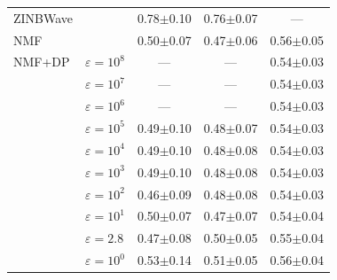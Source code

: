 \begin{tabular}{llccc}
\addlinespace[3pt]
ZINBWave &  & 0.78{\scriptsize$\pm$0.10} & 0.76{\scriptsize$\pm$0.07} & --- \\
\addlinespace[3pt]
NMF &  & 0.50{\scriptsize$\pm$0.07} & 0.47{\scriptsize$\pm$0.06} & 0.56{\scriptsize$\pm$0.05} \\
\addlinespace[3pt]
NMF+DP & $\varepsilon=10^{8}$ & --- & --- & 0.54{\scriptsize$\pm$0.03} \\
 & $\varepsilon=10^{7}$ & --- & --- & 0.54{\scriptsize$\pm$0.03} \\
 & $\varepsilon=10^{6}$ & --- & --- & 0.54{\scriptsize$\pm$0.03} \\
 & $\varepsilon=10^{5}$ & 0.49{\scriptsize$\pm$0.10} & 0.48{\scriptsize$\pm$0.07} & 0.54{\scriptsize$\pm$0.03} \\
 & $\varepsilon=10^{4}$ & 0.49{\scriptsize$\pm$0.10} & 0.48{\scriptsize$\pm$0.08} & 0.54{\scriptsize$\pm$0.03} \\
 & $\varepsilon=10^{3}$ & 0.49{\scriptsize$\pm$0.10} & 0.48{\scriptsize$\pm$0.08} & 0.54{\scriptsize$\pm$0.03} \\
 & $\varepsilon=10^{2}$ & 0.46{\scriptsize$\pm$0.09} & 0.48{\scriptsize$\pm$0.08} & 0.54{\scriptsize$\pm$0.03} \\
 & $\varepsilon=10^{1}$ & 0.50{\scriptsize$\pm$0.07} & 0.47{\scriptsize$\pm$0.07} & 0.54{\scriptsize$\pm$0.04} \\
 & $\varepsilon=2.8$ & 0.47{\scriptsize$\pm$0.08} & 0.50{\scriptsize$\pm$0.05} & 0.55{\scriptsize$\pm$0.04} \\
 & $\varepsilon=10^{0}$ & 0.53{\scriptsize$\pm$0.14} & 0.51{\scriptsize$\pm$0.05} & 0.56{\scriptsize$\pm$0.04} \\
\bottomrule
\end{tabular}

